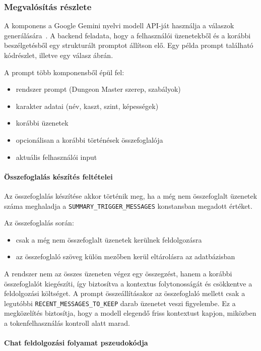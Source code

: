 \documentclass[
]{thesis-ekf}
\theoremstyle{definition}
\theoremstyle{remark}
\begin{document}
\subsubsection{Megvalósítás részlete}

A komponens  a Google Gemini nyelvi modell API-ját használja a válaszok generálására~\cite{gemini_api}. A backend feladata, hogy a felhasználói üzenetekből és a korábbi beszélgetésből egy strukturált promptot állítson elő. Egy példa prompt található  kódrészlet, illetve egy válasz  ábrán.

A prompt több komponensből épül fel:
\begin{itemize}
    \item rendszer prompt (Dungeon Master szerep, szabályok)
    \item karakter adatai (név, kaszt, szint, képességek)
    \item korábbi üzenetek
    \item opcionálisan a korábbi történések összefoglalója
    \item aktuális felhasználói input
\end{itemize}

\paragraph{Összefoglalás készítés feltételei}

Az összefoglalás készítése akkor történik meg, ha a még nem összefoglalt üzenetek száma meghaladja a \texttt{SUMMARY\_TRIGGER\_MESSAGES} konstansban megadott értéket.

Az összefoglalás során:
\begin{itemize}
    \item csak a még nem összefoglalt üzenetek kerülnek feldolgozásra
    \item az összefoglaló szöveg külön mezőben kerül eltárolásra az adatbázisban
\end{itemize}

A rendszer nem az összes üzeneten végez egy összegzést, hanem a korábbi összefoglalót kiegészíti, így biztosítva a kontextus folytonosságát és csökkentve a feldolgozási költséget. A prompt összeállításakor az összefoglaló mellett csak a legutóbbi \texttt{RECENT\_MESSAGES\_TO\_KEEP} darab üzenetet veszi figyelembe. Ez a megközelítés biztosítja, hogy a modell elegendő friss kontextust kapjon, miközben a tokenfelhasználás kontroll alatt marad.

\paragraph{Chat feldolgozási folyamat pszeudokódja}
\end{document}
